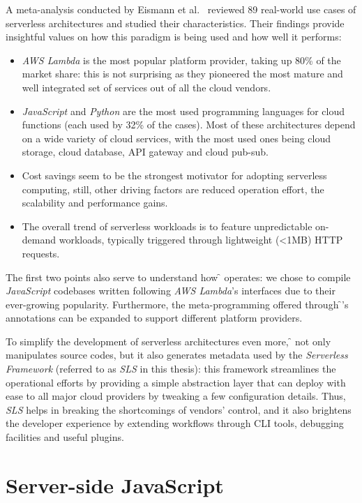 A meta-analysis conducted by Eismann et al.~\cite{meta-analysis} reviewed
89 real-world use cases of serverless architectures and studied their characteristics.
Their findings provide insightful values on how this
paradigm is being used and how well it performs:
\begin{itemize}
  \item \textit{AWS Lambda} is the most popular platform provider, taking up 80\% of the market share:
    this is not surprising as they pioneered the most mature and well integrated set of services out of all
    the cloud vendors.
  \item \textit{JavaScript} and \textit{Python} are the most used
    programming languages for cloud functions (each used by 32\% of the cases).
    Most of these architectures depend on a wide variety of cloud services, with the most used
    ones being cloud storage, cloud database, API gateway and cloud pub-sub.
  \item Cost savings seem to be the strongest motivator for adopting serverless computing,
    still, other driving factors are reduced operation effort, the scalability and performance gains.
  \item The overall trend of serverless workloads is to feature unpredictable on-demand
  workloads, typically triggered through lightweight (<1MB) HTTP requests.
\end{itemize}

The first two points also serve to understand how \f{} operates:
we chose to compile \textit{JavaScript} codebases written following
\textit{AWS Lambda}'s interfaces due to their ever-growing popularity.
Furthermore, the meta-programming offered through \f{}'s annotations
can be expanded to support different platform providers.

To simplify the development of serverless architectures even more,
\f{} not only manipulates source codes, but it also generates metadata used
by the \textit{Serverless Framework} \cite{sls} (referred to as \textit{SLS} in this thesis):
this framework streamlines the operational efforts by providing a simple abstraction layer
that can deploy with ease to all major cloud providers by tweaking a few configuration details.
Thus, \textit{SLS} helps in breaking the shortcomings of vendors' control, and it also brightens
the developer experience by extending workflows through CLI tools, debugging facilities and useful plugins.

\section{Server-side JavaScript}
\label{sec:node}


